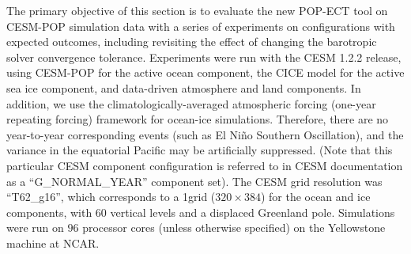 \documentclass[gmd, manuscript]{copernicus}
\begin{document}


The primary objective of this section is to evaluate the new POP-ECT tool on CESM-POP simulation data with a series of experiments on configurations with expected outcomes, including revisiting the effect of changing the barotropic solver convergence tolerance. Experiments were run with the CESM 1.2.2 release, using CESM-POP for the active ocean component, the CICE model for the active sea ice component, and data-driven atmosphere and land components. In addition, we use the climatologically-averaged atmospheric forcing (one-year repeating forcing) framework for ocean-ice simulations. Therefore, there are no year-to-year corresponding events (such as El Ni\~{n}o Southern Oscillation), and the variance in the equatorial Pacific may be artificially suppressed. (Note that this particular CESM component configuration is referred to in CESM documentation as a ``G\_NORMAL\_YEAR” component set). The CESM grid resolution was “T62\_g16”, which corresponds to a 1\degree grid ($320 \times 384$) for the ocean and ice components, with $60$ vertical levels and a displaced Greenland pole. Simulations were run on $96$ processor cores (unless otherwise specified) on the Yellowstone machine at NCAR. 
\end{document}
